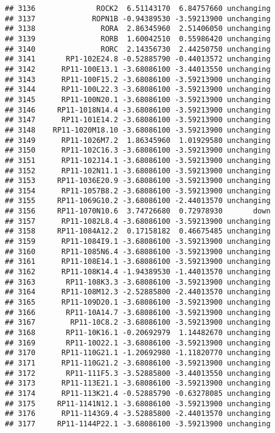 \documentclass[]{article}
\begin{document}
\begin{verbatim}
## 3136              ROCK2  6.51143170  6.84757660 unchanging
## 3137             ROPN1B -0.94389530 -3.59213900 unchanging
## 3138               RORA  2.86345960  2.51406050 unchanging
## 3139               RORB  1.60042510  0.55986420 unchanging
## 3140               RORC  2.14356730  2.44250750 unchanging
## 3141       RP1-102E24.8 -0.52885790 -0.44013572 unchanging
## 3142      RP11-100E13.1 -3.68086100 -3.44013550 unchanging
## 3143      RP11-100F15.2 -3.68086100 -3.59213900 unchanging
## 3144      RP11-100L22.3 -3.68086100 -3.59213900 unchanging
## 3145      RP11-100N20.1 -3.68086100 -3.59213900 unchanging
## 3146     RP11-1018N14.4 -3.68086100 -3.59213900 unchanging
## 3147      RP11-101E14.2 -3.68086100 -3.59213900 unchanging
## 3148    RP11-1020M18.10 -3.68086100 -3.59213900 unchanging
## 3149      RP11-1026M7.2  1.86345960  1.01929580 unchanging
## 3150      RP11-102C16.3 -3.68086100 -3.59213900 unchanging
## 3151      RP11-102J14.1 -3.68086100 -3.59213900 unchanging
## 3152      RP11-102N11.1 -3.68086100 -3.59213900 unchanging
## 3153     RP11-1036E20.9 -3.68086100 -3.59213900 unchanging
## 3154      RP11-1057B8.2 -3.68086100 -3.59213900 unchanging
## 3155     RP11-1069G10.2 -3.68086100 -2.44013570 unchanging
## 3156     RP11-1070N10.6  3.74726680  0.72978930       down
## 3157      RP11-1082L8.4 -3.68086100 -3.59213900 unchanging
## 3158     RP11-1084A12.2  0.17158182  0.46675485 unchanging
## 3159      RP11-1084I9.1 -3.68086100 -3.59213900 unchanging
## 3160      RP11-1085N6.4 -3.68086100 -3.59213900 unchanging
## 3161      RP11-108E14.1 -3.68086100 -3.59213900 unchanging
## 3162      RP11-108K14.4 -1.94389530 -1.44013570 unchanging
## 3163       RP11-108K3.3 -3.68086100 -3.59213900 unchanging
## 3164      RP11-108M12.3 -2.52885800 -2.44013570 unchanging
## 3165      RP11-109D20.1 -3.68086100 -3.59213900 unchanging
## 3166       RP11-10A14.7 -3.68086100 -3.59213900 unchanging
## 3167        RP11-10C8.2 -3.68086100 -3.59213900 unchanging
## 3168       RP11-10K16.1 -0.20692979  1.14482670 unchanging
## 3169       RP11-10O22.1 -3.68086100 -3.59213900 unchanging
## 3170      RP11-110G21.1 -1.20692980 -1.11820770 unchanging
## 3171      RP11-110G21.2 -3.68086100 -3.59213900 unchanging
## 3172       RP11-111F5.3 -3.52885800 -3.44013550 unchanging
## 3173      RP11-113E21.1 -3.68086100 -3.59213900 unchanging
## 3174      RP11-113K21.4 -0.52885790 -0.63278085 unchanging
## 3175     RP11-1141N12.1 -3.68086100 -3.59213900 unchanging
## 3176      RP11-1143G9.4 -3.52885800 -2.44013570 unchanging
## 3177     RP11-1144P22.1 -3.68086100 -3.59213900 unchanging

\end{verbatim}
\end{document}
